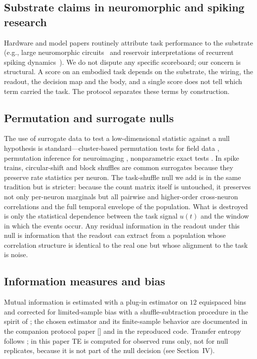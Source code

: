 \documentclass[journal]{IEEEtran}
\begin{document}
\subsection{Substrate claims in neuromorphic and spiking research}
Hardware and model papers routinely attribute task performance to the substrate
(e.g., large neuromorphic circuits~\cite{merolla2014,davies2018} and reservoir
interpretations of recurrent spiking dynamics~\cite{maass2002,lukosevicius2009}).
We do not dispute any specific scoreboard; our concern is structural. A score on
an embodied task depends on the substrate, the wiring, the readout, the decision
map and the body, and a single score does not tell which term carried the task.
The protocol separates these terms by construction.

\subsection{Permutation and surrogate nulls}
The use of surrogate data to test a low-dimensional statistic against a null
hypothesis is standard---cluster-based permutation tests for field data
\cite{maris2007}, permutation inference for neuroimaging \cite{nichols2002},
nonparametric exact tests \cite{good2005,efron1993}. In spike trains,
circular-shift and block shuffles are common surrogates because they preserve
rate statistics per neuron. The task-shuffle null we add is in the same tradition
but is stricter: because the count matrix itself is untouched, it preserves not
only per-neuron marginals but all pairwise and higher-order cross-neuron
correlations and the full temporal envelope of the population. What is destroyed
is only the statistical dependence between the task signal $u(t)$ and the window
in which the events occur. Any residual information in the readout under this
null is information that the readout can extract from a population whose
correlation structure is identical to the real one but whose alignment to the
task is noise.

\subsection{Information measures and bias}
Mutual information is estimated with a plug-in estimator on $12$ equispaced bins
and corrected for limited-sample bias with a shuffle-subtraction procedure in the
spirit of \cite{panzeri2007}; the chosen estimator and its finite-sample behavior
are documented in the companion protocol paper [\cite{b1}] and in the
reproduced code. Transfer entropy follows \cite{schreiber2000}; in this paper TE
is computed for observed runs only, not for null replicates, because it is not
part of the null decision (see Section~IV).
\end{document}
